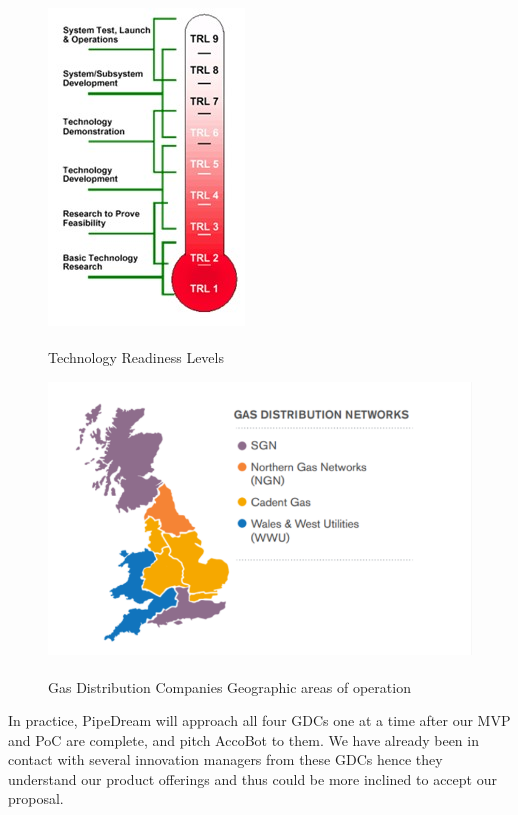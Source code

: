 \documentclass[11pt]{article}		%
\newlength{\imageheight}	 %
\newcommand{\supercite}[1]{\textsuperscript{\cite{#1}}}		%
\begin{document}
    	\begin{figure}[h]
    					\centering
    					\begin{multicols}{2}
    						\includegraphics[height=\imageheight]{TRL.jpg}
    						\caption{Technology Readiness Levels\supercite{sönnichsen_5_2021}}
    						\label{techReadyLevels}
    						\columnbreak
    						\includegraphics[height=\imageheight]{distribution.pdf}
    						\caption{Gas Distribution Companies Geographic areas of operation\supercite{sönnichsen_5_2021}}
    						\label{distrit2}
    					\end{multicols}
    				\end{figure}
    		\vspace{-0.5cm}
    	In practice, PipeDream will approach all four GDCs one at a time after our MVP and PoC are complete, and pitch AccoBot to them. We have already been in contact with several innovation managers from these GDCs hence they understand our product offerings and thus could be more inclined to accept our proposal. 
\end{document}
